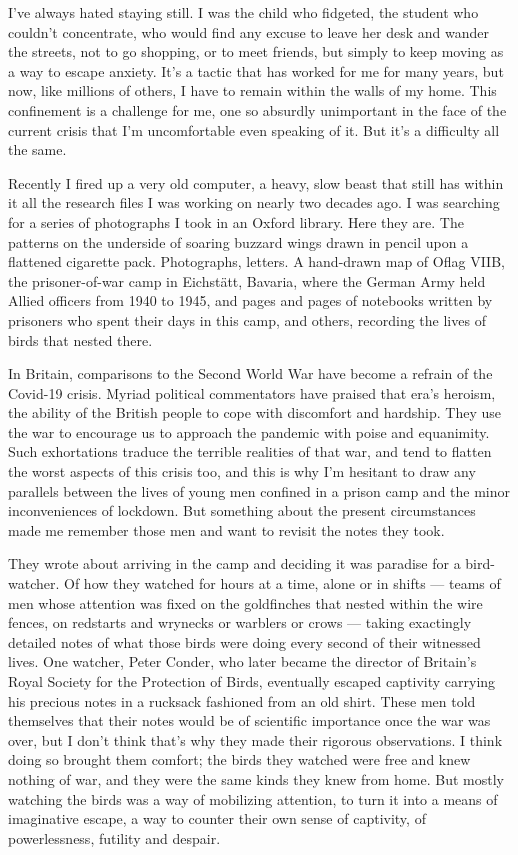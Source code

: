 I've always hated staying still. I was the child who fidgeted, the
student who couldn't concentrate, who would find any excuse to leave her
desk and wander the streets, not to go shopping, or to meet friends, but
simply to keep moving as a way to escape anxiety. It's a tactic that has
worked for me for many years, but now, like millions of others, I have
to remain within the walls of my home. This confinement is a challenge
for me, one so absurdly unimportant in the face of the current crisis
that I'm uncomfortable even speaking of it. But it's a difficulty all
the same.

Recently I fired up a very old computer, a heavy, slow beast that still
has within it all the research files I was working on nearly two decades
ago. I was searching for a series of photographs I took in an Oxford
library. Here they are. The patterns on the underside of soaring buzzard
wings drawn in pencil upon a flattened cigarette pack. Photographs,
letters. A hand-drawn map of Oflag VIIB, the prisoner-of-war camp in
Eichstätt, Bavaria, where the German Army held Allied officers from 1940
to 1945, and pages and pages of notebooks written by prisoners who spent
their days in this camp, and others, recording the lives of birds that
nested there.

In Britain, comparisons to the Second World War have become a refrain of
the Covid-19 crisis. Myriad political commentators have praised that
era's heroism, the ability of the British people to cope with discomfort
and hardship. They use the war to encourage us to approach the pandemic
with poise and equanimity. Such exhortations traduce the terrible
realities of that war, and tend to flatten the worst aspects of this
crisis too, and this is why I'm hesitant to draw any parallels between
the lives of young men confined in a prison camp and the minor
inconveniences of lockdown. But something about the present
circumstances made me remember those men and want to revisit the notes
they took.

They wrote about arriving in the camp and deciding it was paradise for a
bird-watcher. Of how they watched for hours at a time, alone or in
shifts --- teams of men whose attention was fixed on the goldfinches
that nested within the wire fences, on redstarts and wrynecks or
warblers or crows --- taking exactingly detailed notes of what those
birds were doing every second of their witnessed lives. One watcher,
Peter Conder, who later became the director of Britain's Royal Society
for the Protection of Birds, eventually escaped captivity carrying his
precious notes in a rucksack fashioned from an old shirt. These men told
themselves that their notes would be of scientific importance once the
war was over, but I don't think that's why they made their rigorous
observations. I think doing so brought them comfort; the birds they
watched were free and knew nothing of war, and they were the same kinds
they knew from home. But mostly watching the birds was a way of
mobilizing attention, to turn it into a means of imaginative escape, a
way to counter their own sense of captivity, of powerlessness, futility
and despair.

